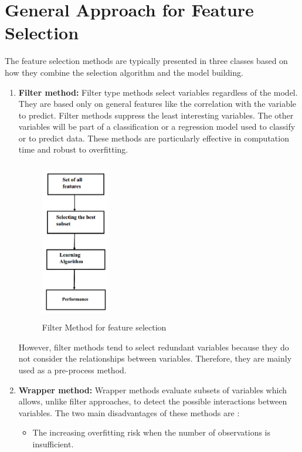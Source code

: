 \documentclass[document.tex]{subfiles}
\begin{document}
\section{General Approach for Feature Selection}
\noindent The feature selection methods are typically presented in three classes based on how they combine the selection algorithm and the model building.
\begin{enumerate}
	\item \textbf{Filter method: }Filter type methods select variables regardless of the model. They are based only on general features like the correlation with the variable to predict. Filter methods suppress the least interesting variables. The other variables will be part of a classification or a regression model used to classify or to predict data. These methods are particularly effective in computation time and robust to overfitting.
	\begin{figure}[H]
		\begin{center}
			\includegraphics[height=7.0cm,width=3cm]{imgs/filterMethod.png}
		\end{center}
		\caption{Filter Method for feature selection}
		\label{fig:Filter Method for feature selection}
	\end{figure}
	However, filter methods tend to select redundant variables because they do not consider the relationships between variables. Therefore, they are mainly used as a pre-process method.
	\item \textbf{Wrapper method:} Wrapper methods evaluate subsets of variables which allows, unlike filter approaches, to detect the possible interactions between variables. The two main disadvantages of these methods are :
	\begin{itemize}
		\item The increasing overfitting risk when the number of observations is insufficient.

\end{itemize}
\end{enumerate}
\end{document}
